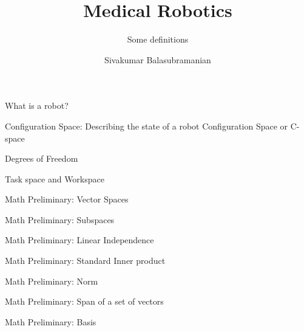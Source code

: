 \documentclass[aspectratio=169]{beamer}
\title{Medical Robotics}
\subtitle{Some definitions}
\author{Sivakumar Balasubramanian}
\institute[Christian Medical College] %
{
  \inst{}%
  Department of Bioengineering\\
  Christian Medical College Vellore
}
\date{}
\begin{document}
\begin{frame}
  \titlepage
\end{frame}

\begin{frame}{What is a robot?}
  
\end{frame}


\begin{frame}{Configuration Space: Describing the state of a robot}
  Configuration Space or C-space
  
\end{frame}


\begin{frame}{Degrees of Freedom}
  
\end{frame}


\begin{frame}{Task space and Workspace}
  
\end{frame}


\begin{frame}{Math Preliminary: Vector Spaces}
  
\end{frame}


\begin{frame}{Math Preliminary: Subspaces}
  
\end{frame}


\begin{frame}{Math Preliminary: Linear Independence}
  
\end{frame}


\begin{frame}{Math Preliminary: Standard Inner product}
  
\end{frame}


\begin{frame}{Math Preliminary: Norm}
  
\end{frame}


\begin{frame}{Math Preliminary: Span of a set of vectors}
  
\end{frame}


\begin{frame}{Math Preliminary: Basis}
  
\end{frame}
\end{document}

